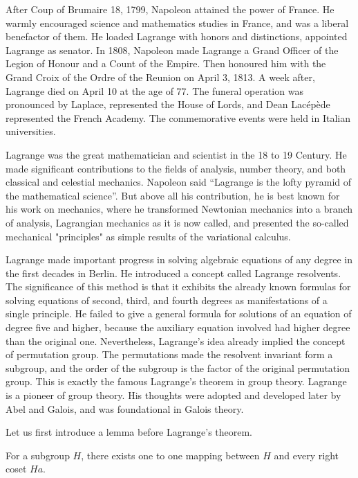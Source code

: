 \documentclass[b5paper]{article}
\begin{document}
After Coup of Brumaire 18, 1799, Napoleon attained the power of France. He warmly encouraged science and mathematics studies in France, and was a liberal benefactor of them. He loaded Lagrange with honors and distinctions, appointed Lagrange as senator. In 1808, Napoleon made Lagrange a Grand Officer of the Legion of Honour and a Count of the Empire. Then honoured him with the Grand Croix of the Ordre of the Reunion on April 3, 1813. A week after, Lagrange died on April 10 at the age of 77. The funeral operation was pronounced by Laplace, represented the House of Lords, and Dean Lacépède represented the French Academy. The commemorative events were held in Italian universities.

Lagrange was the great mathematician and scientist in the 18 to 19 Century. He made significant contributions to the fields of analysis, number theory, and both classical and celestial mechanics. Napoleon said ``Lagrange is the lofty pyramid of the mathematical science''. But above all his contribution, he is best known for his work on mechanics, where he transformed Newtonian mechanics into a branch of analysis, Lagrangian mechanics as it is now called, and presented the so-called mechanical "principles" as simple results of the variational calculus.

Lagrange made important progress in solving algebraic equations of any degree in the first decades in Berlin. He introduced a concept called Lagrange resolvents. The significance of this method is that it exhibits the already known formulas for solving equations of second, third, and fourth degrees as manifestations of a single principle. He failed to give a general formula for solutions of an equation of degree five and higher, because the auxiliary equation involved had higher degree than the original one. Nevertheless, Lagrange's idea already implied the concept of permutation group. The permutations made the resolvent invariant form a subgroup, and the order of the subgroup is the factor of the original permutation group. This is exactly the famous Lagrange's theorem in group theory. Lagrange is a pioneer of group theory. His thoughts were adopted and developed later by Abel and Galois, and was foundational in Galois theory.

Let us first introduce a lemma before Lagrange's theorem.

\begin{lemma}
For a subgroup $H$, there exists one to one mapping between $H$ and every right coset $Ha$.
\end{lemma}
\end{document}
